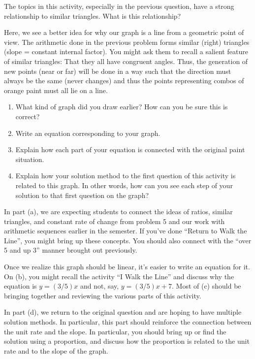 \documentclass[nooutcomes, handout]{ximera}
\begin{document}
\begin{question}
The topics in this activity, especially in the previous question, have a strong relationship to similar triangles.  What is this relationship?

\begin{instructorNotes}
Here, we see a better idea for why our graph is a line from a geometric point of view.  The arithmetic done in the previous problem forms similar (right) triangles (slope = constant internal factor).  You might ask them to recall a salient feature of similar triangles: That they all have congruent angles.  Thus, the generation of new points (near or far) will be done in a way such that the direction must always be the same (never changes) and thus the points representing combos of orange paint must all lie on a line.
\end{instructorNotes}
\end{question}



\begin{question}
\begin{enumerate}
    \item What kind of graph did you draw earlier?  How can you be sure this is correct?
    \item Write an equation corresponding to your graph.
    \item Explain how each part of your equation is connected with the original paint situation.
    \item Explain how your solution method to the first question of this activity is related to this graph.  In other words, how can you see each step of your solution to that first question on the graph?
\end{enumerate}

\begin{instructorNotes}
In part (a), we are expecting students to connect the ideas of ratios, similar triangles, and constant rate of change from problem 5 and our work with arithmetic sequences earlier in the semester.  If you've done ``Return to Walk the Line'', you might bring up these concepts.  You should also connect with the ``over 5 and up 3'' manner brought out previously.

Once we realize this graph should be linear, it's easier to write an equation for it.  On (b), you might recall the activity ``I Walk the Line'' and discuss why the equation is $y = (3/5)x$ and not, say, $y = (3/5)x + 7$.  Most of (c) should be bringing together and reviewing the various parts of this activity.

In part (d), we return to the original question and are hoping to have multiple solution methods.  In particular, this part should reinforce the connection between the unit rate and the slope.  In particular, you should bring up or find the solution using a proportion, and discuss how the proportion is related to the unit rate and to the slope of the graph.
\end{instructorNotes}

\end{question}
\end{document}
